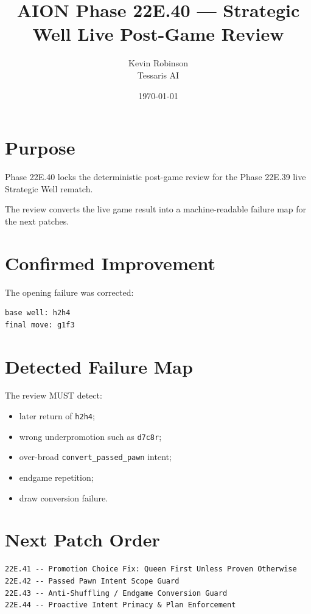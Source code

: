 \documentclass[11pt,a4paper]{article}
\title{\textbf{AION Phase 22E.40 --- Strategic Well Live Post-Game Review}}
\author{Kevin Robinson\\Tessaris AI}
\date{\today}
\begin{document}
\maketitle

\section{Purpose}

Phase 22E.40 locks the deterministic post-game review for the Phase 22E.39 live Strategic Well rematch.

The review converts the live game result into a machine-readable failure map for the next patches.

\section{Confirmed Improvement}

The opening failure was corrected:

\begin{verbatim}
base well: h2h4
final move: g1f3
\end{verbatim}

\section{Detected Failure Map}

The review MUST detect:

\begin{itemize}[leftmargin=*]
  \item later return of \texttt{h2h4};
  \item wrong underpromotion such as \texttt{d7c8r};
  \item over-broad \texttt{convert\_passed\_pawn} intent;
  \item endgame repetition;
  \item draw conversion failure.
\end{itemize}

\section{Next Patch Order}

\begin{verbatim}
22E.41 -- Promotion Choice Fix: Queen First Unless Proven Otherwise
22E.42 -- Passed Pawn Intent Scope Guard
22E.43 -- Anti-Shuffling / Endgame Conversion Guard
22E.44 -- Proactive Intent Primacy & Plan Enforcement
\end{verbatim}
\end{document}
